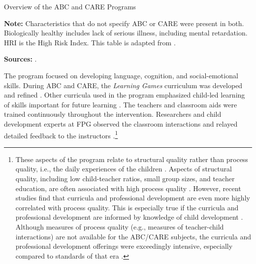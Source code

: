 \begin{table}[!htbp]
\centering
\caption{Overview of the ABC and CARE Programs}
\label{tab:abc-care-characteristics}
\begin{threeparttable}
	
\begin{tablenotes}
\footnotesize
\item \textbf{Note:} Characteristics that do not specify ABC or CARE were present in both. Biologically healthy includes lack of serious illness, including mental retardation. HRI is the High Risk Index. This table is adapted from \citet{Elango_Hojman_etal_2016_Early-Edu}. \\
\item \textbf{Sources:} \citet{Ramey_Collier_etal_1976_CarolinaAbecedarianProject,Ramey_Smith_1977_AJMD,Ramey_etal_1985_Project-CARE_TiECSE,Wasik_Ramey_etal_1990_CD,Ramey_Campbell_1991_childreninpoverty}.
\end{tablenotes}
\end{threeparttable}
\end{table}

The program focused on developing language, cognition, and social-emotional skills. During ABC and CARE, the \textit{Learning Games} curriculum was developed and refined \citep{Sparling_Lewis_1979_BOOKLearninggamesFirstThree,Sparling_Lewis_1984_BOOKLearningGamesThreesFours}. Other curricula used in the program emphasized child-led learning of skills important for future learning \citep{Ramey_Smith_1977_AJMD, Wasik_Ramey_etal_1990_CD, Ramey_Campbell_1991_childreninpoverty}. The teachers and classroom aids were trained continuously throughout the intervention. Researchers and child development experts at FPG observed the classroom interactions and relayed detailed feedback to the instructors \citep{Ramey-etal_2012-ABC}.\footnote{These aspects of the program relate to structural quality rather than process quality, i.e., the daily experiences of the children \citep{Thomason_LaParo_2009_EED}. Aspects of structural quality, including low child-teacher ratios, small group sizes, and teacher education, are often associated with high process quality \citep{Phillipsen_etal_1997_ECRQ}. However, recent studies find that curricula and professional development are even more highly correlated with process quality. This is especially true if the curricula and professional development are informed by knowledge of child development \citep{Slot_etal_2015_Dutch_ECRQ}. Although measures of process quality (e.g., measures of teacher-child interactions) are not available for the ABC/CARE subjects, the curricula and professional development offerings were exceedingly intensive, especially compared to standards of that era \citep{Burchinal_etal_1989_CD_Daycare-Pre-K-Dev}.}

